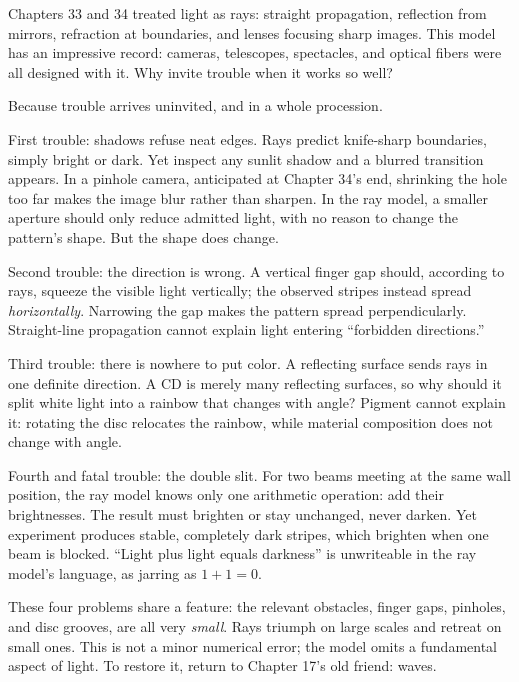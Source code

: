 
Chapters 33 and 34 treated light as rays: straight propagation, reflection from mirrors, refraction at boundaries, and lenses focusing sharp images. This model has an impressive record: cameras, telescopes, spectacles, and optical fibers were all designed with it. Why invite trouble when it works so well?

Because trouble arrives uninvited, and in a whole procession.

First trouble: shadows refuse neat edges. Rays predict knife-sharp boundaries, simply bright or dark. Yet inspect any sunlit shadow and a blurred transition appears. In a pinhole camera, anticipated at Chapter 34's end, shrinking the hole too far makes the image blur rather than sharpen. In the ray model, a smaller aperture should only reduce admitted light, with no reason to change the pattern's shape. But the shape does change.

Second trouble: the direction is wrong. A vertical finger gap should, according to rays, squeeze the visible light vertically; the observed stripes instead spread \emph{horizontally}. Narrowing the gap makes the pattern spread perpendicularly. Straight-line propagation cannot explain light entering ``forbidden directions.''

Third trouble: there is nowhere to put color. A reflecting surface sends rays in one definite direction. A CD is merely many reflecting surfaces, so why should it split white light into a rainbow that changes with angle? Pigment cannot explain it: rotating the disc relocates the rainbow, while material composition does not change with angle.

Fourth and fatal trouble: the double slit. For two beams meeting at the same wall position, the ray model knows only one arithmetic operation: add their brightnesses. The result must brighten or stay unchanged, never darken. Yet experiment produces stable, completely dark stripes, which brighten when one beam is blocked. ``Light plus light equals darkness'' is unwriteable in the ray model's language, as jarring as \(1+1=0\).

These four problems share a feature: the relevant obstacles, finger gaps, pinholes, and disc grooves, are all very \emph{small}. Rays triumph on large scales and retreat on small ones. This is not a minor numerical error; the model omits a fundamental aspect of light. To restore it, return to Chapter 17's old friend: waves.


